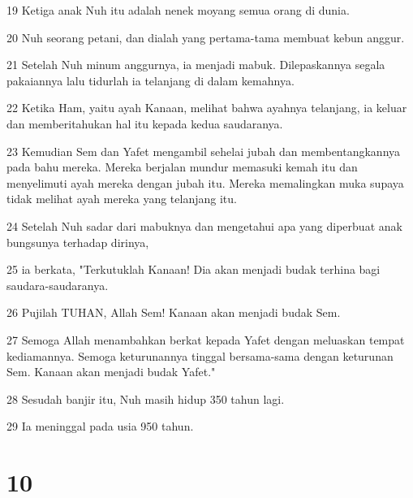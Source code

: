 \par 19 Ketiga anak Nuh itu adalah nenek moyang semua orang di dunia.
\par 20 Nuh seorang petani, dan dialah yang pertama-tama membuat kebun anggur.
\par 21 Setelah Nuh minum anggurnya, ia menjadi mabuk. Dilepaskannya segala pakaiannya lalu tidurlah ia telanjang di dalam kemahnya.
\par 22 Ketika Ham, yaitu ayah Kanaan, melihat bahwa ayahnya telanjang, ia keluar dan memberitahukan hal itu kepada kedua saudaranya.
\par 23 Kemudian Sem dan Yafet mengambil sehelai jubah dan membentangkannya pada bahu mereka. Mereka berjalan mundur memasuki kemah itu dan menyelimuti ayah mereka dengan jubah itu. Mereka memalingkan muka supaya tidak melihat ayah mereka yang telanjang itu.
\par 24 Setelah Nuh sadar dari mabuknya dan mengetahui apa yang diperbuat anak bungsunya terhadap dirinya,
\par 25 ia berkata, "Terkutuklah Kanaan! Dia akan menjadi budak terhina bagi saudara-saudaranya.
\par 26 Pujilah TUHAN, Allah Sem! Kanaan akan menjadi budak Sem.
\par 27 Semoga Allah menambahkan berkat kepada Yafet dengan meluaskan tempat kediamannya. Semoga keturunannya tinggal bersama-sama dengan keturunan Sem. Kanaan akan menjadi budak Yafet."
\par 28 Sesudah banjir itu, Nuh masih hidup 350 tahun lagi.
\par 29 Ia meninggal pada usia 950 tahun.

\chapter{10}

